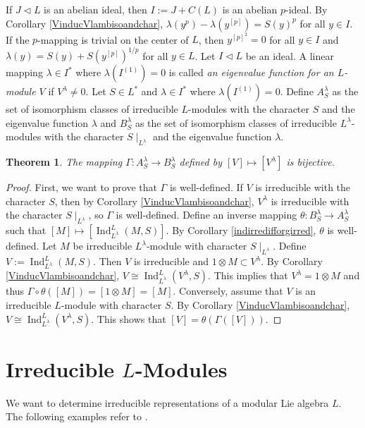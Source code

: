 \documentclass[12pt,MSc]{muthesis_2023}
\theoremstyle{plain}%
\newtheorem{Theorem}[FactCounter]{Theorem} %
\theoremstyle{definition}
\theoremstyle{remark}
\DeclareMathOperator{\Ind}{Ind}
\begin{document}
If $J\lhd L$ is an abelian ideal, then $I:= J+C(L)$ is an abelian $p$-ideal. By Corollary \ref{VinducVlambisoandchar}, $\lambda(y^p)-\lambda(y^{[p]})={S(y)}^p$ for all $y\in I$. If the $p$-mapping is trivial on the center of $L$, then $y^{[p]^2}=0$ for all $y\in I$ and $\lambda(y)=S(y)+S(y^{[p]})^{1/p}$ for all $y\in L$. Let $I\lhd L$ be an ideal. A linear mapping $\lambda \in I^*$ where $\lambda(I^{(1)})=0$ is called \textit{an eigenvalue function for an $L$-module $V$} if $V^{\lambda}\neq 0$. Let $S\in L^*$ and $\lambda\in I^*$ where $\lambda(I^{(1)})=0$. Define $A^{\lambda}_S$ as the set of isomorphism classes of irreducible $L$-modules with the character $S$ and the eigenvalue function $\lambda$ and $B^{\lambda}_S$ as the set of isomorphism classes of irreducible $L^{\lambda}$-modules with the character $S\mid_{L^{\lambda}}$ and the eigenvalue function $\lambda$.

\begin{Theorem}\label{ASlambisoBSlamb}
The mapping $\Gamma: A^{\lambda}_S \rightarrow B^{\lambda}_S$ defined by $[V] \mapsto [V^{\lambda}]$ is bijective.
\end{Theorem}

\begin{proof}
First, we want to prove that $\Gamma$ is well-defined. If $V$ is irreducible with the character $S$, then by Corollary \ref{VinducVlambisoandchar}, $V^{\lambda}$ is irreducible with the character $S\mid_{L^{\lambda}}$, so $\Gamma$ is well-defined. Define an inverse mapping $\theta: B^{\lambda}_S \rightarrow A^{\lambda}_S$ such that $[M]\mapsto [\Ind^L_{L^{\lambda}}(M, S)]$. By Corollary \ref{indirredifforgirred}, $\theta$ is well-defined. Let $M$ be irreducible $L^{\lambda}$-module with character $S\mid_{L^{\lambda}}$. Define $V:=\Ind^L_{L^{\lambda}}(M, S)$. Then $V$ is irreducible and $1\otimes M \subset V^{\lambda}$. By Corollary \ref{VinducVlambisoandchar}, $V \cong \Ind^L_{L^{\lambda}}(V^{\lambda}, S)$. This implies that $V^{\lambda}=1\otimes M$ and thus $\Gamma \circ \theta([M])=[1\otimes M]=[M]$. Conversely, assume that $V$ is an irreducible $L$-module with character $S$. By Corollary \ref{VinducVlambisoandchar}, $V\cong \Ind^L_{L^{\lambda}}(V^{\lambda}, S)$. This shows that $[V]=\theta(\Gamma([V]))$.
\end{proof}

\chapter{Irreducible $L$-Modules}
We want to determine irreducible representations of a modular Lie algebra $L$. The following examples refer to \cite[Section 9, Chapter 5]{SF}.
\end{document}
